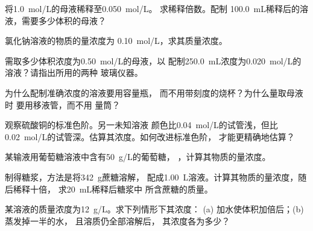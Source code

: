 \begin{exercise}[$\star$]\label{exo:g10:concentration-and-dilution:4}
将\qty{1.0}{mol/L}的母液稀释至\qty{0.050}{mol/L}。
求稀释倍数。配制
\qty{100.0}{mL}稀释后的溶液，需要多少体积的母液？
\end{exercise}

\begin{exercise}[$\star$]\label{exo:g10:concentration-and-dilution:5}
氯化钠溶液的物质的量浓度为
\qty{0.10}{mol/L}，求其质量浓度。
\end{exercise}

\begin{exercise}[$\star\star$]\label{exo:g10:concentration-and-dilution:6}
需取多少体积浓度为\qty{0.50}{mol/L}的母液，以
配制\qty{250.0}{mL}浓度为\qty{0.020}{mol/L}的溶液？请指出所用的两种
玻璃仪器。
\end{exercise}

\begin{exercise}[$\star\star$]\label{exo:g10:concentration-and-dilution:7}
为什么配制准确浓度的溶液要用容量瓶，
而不用带刻度的烧杯？为什么量取母液时
要用移液管，而不用
量筒？
\end{exercise}

\begin{exercise}[$\star\star$]\label{exo:g10:concentration-and-dilution:8}
观察硫酸铜的标准色阶。另一未知溶液
颜色比\qty{0.04}{mol/L}的试管浅，但比
\qty{0.02}{mol/L}的试管深。估算其浓度。如何改进标准色阶，
才能更精确地估算？
\end{exercise}

\begin{exercise}[$\star\star$]\label{exo:g10:concentration-and-dilution:9}
某输液用葡萄糖溶液中含有\qty{50}{g/L}的葡萄糖，
，计算其物质的量浓度。
\end{exercise}

\begin{exercise}[$\star\star$]\label{exo:g10:concentration-and-dilution:10}
制得糖浆，方法是将\qty{342}{g}蔗糖溶解，
配成\qty{1.00}{L}溶液。计算其物质的量浓度，随后稀释十倍，
求\qty{20}{mL}稀释后糖浆中
所含蔗糖的质量。
\end{exercise}

\begin{exercise}[$\star\star$]\label{exo:g10:concentration-and-dilution:11}
某溶液的质量浓度为\qty{12}{g/L}。求下列情形下其浓度：
(a) 加水使体积加倍后；(b) 蒸发掉一半的水，
且溶质仍全部溶解后，
其浓度各为多少？
\end{exercise}

